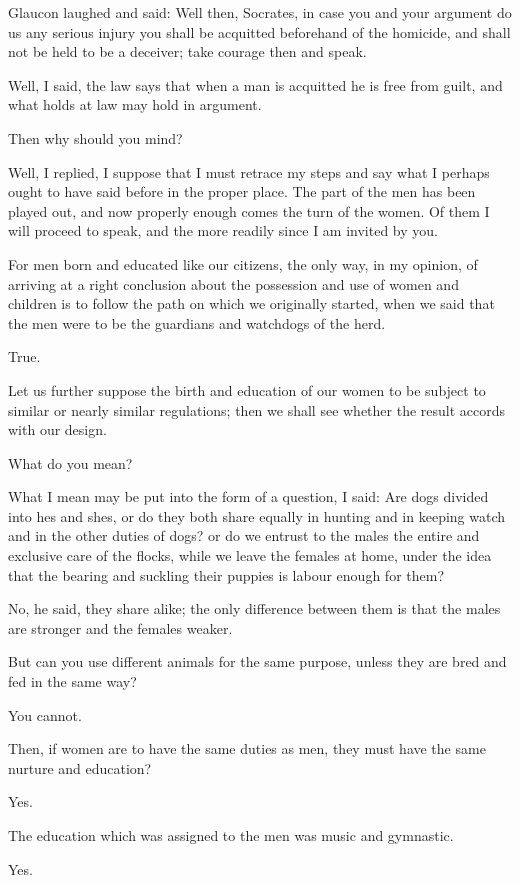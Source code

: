 Glaucon laughed and said: Well then, Socrates, in case you and your
argument do us any serious injury you shall be acquitted beforehand of
the homicide, and shall not be held to be a deceiver; take courage then
and speak.

Well, I said, the law says that when a man is acquitted he is free from
guilt, and what holds at law may hold in argument.

Then why should you mind?

Well, I replied, I suppose that I must retrace my steps and say what I
perhaps ought to have said before in the proper place. The part of the
men has been played out, and now properly enough comes the turn of the
women. Of them I will proceed to speak, and the more readily since I am
invited by you.

For men born and educated like our citizens, the only way, in my
opinion, of arriving at a right conclusion about the possession and
use of women and children is to follow the path on which we originally
started, when we said that the men were to be the guardians and
watchdogs of the herd.

True.

Let us further suppose the birth and education of our women to be
subject to similar or nearly similar regulations; then we shall see
whether the result accords with our design.

What do you mean?

What I mean may be put into the form of a question, I said: Are dogs
divided into hes and shes, or do they both share equally in hunting and
in keeping watch and in the other duties of dogs? or do we entrust to
the males the entire and exclusive care of the flocks, while we leave
the females at home, under the idea that the bearing and suckling their
puppies is labour enough for them?

No, he said, they share alike; the only difference between them is that
the males are stronger and the females weaker.

But can you use different animals for the same purpose, unless they are
bred and fed in the same way?

You cannot.

Then, if women are to have the same duties as men, they must have the
same nurture and education?

Yes.

The education which was assigned to the men was music and gymnastic.

Yes.

